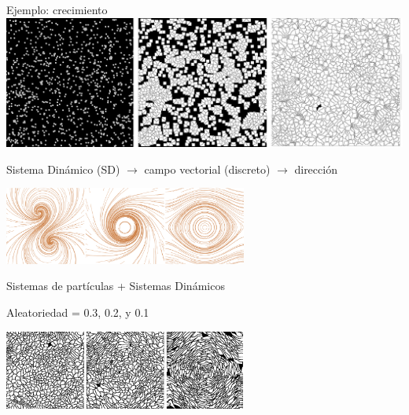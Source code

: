 \documentclass[spanish,unknownkeysallowed,10pt]{beamer}
\begin{document}
\begin{frame}{Ejemplo: crecimiento}
\includegraphics[scale = 0.12]{../figures/modeladocrec}

\vspace{0.1cm}

Sistema Dinámico (SD) $\rightarrow$ campo vectorial (discreto) $\rightarrow$ dirección

\centerline{\includegraphics[width=8cm]{../figures/Fig2}}


\end{frame}

\begin{frame}{Sistemas de partículas + Sistemas Dinámicos}

\centering
Aleatoriedad = 0.3, 0.2, y 0.1

\vspace{0.1cm}
  \includegraphics[width=8cm]{../figures/Fig3}

\end{frame}
\end{document}

